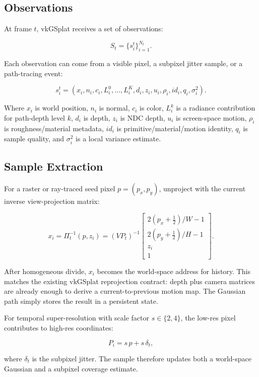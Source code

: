 \documentclass[11pt]{article}
\begin{document}
\subsection{Observations}

At frame $t$, vkGSplat receives a set of observations:

\[
  S_t = \{s_i^t\}_{i=1}^{N_t}.
\]

Each observation can come from a visible pixel, a subpixel jitter sample, or a
path-tracing event:

\[
  s_i^t =
  (x_i, n_i, c_i, L_i^0,\ldots,L_i^K, d_i, z_i, u_i,
   \rho_i, id_i, q_i, \sigma_i^2).
\]

Where $x_i$ is world position, $n_i$ is normal, $c_i$ is color, $L_i^k$ is a
radiance contribution for path-depth level $k$, $d_i$ is depth, $z_i$ is NDC
depth, $u_i$ is screen-space motion, $\rho_i$ is roughness/material metadata,
$id_i$ is primitive/material/motion identity, $q_i$ is sample quality, and
$\sigma_i^2$ is a local variance estimate.

\subsection{Sample Extraction}

For a raster or ray-traced seed pixel $p=(p_x,p_y)$, unproject with the current
inverse view-projection matrix:

\[
  x_i =
  \Pi_t^{-1}(p,z_i)
  =
  \left(VP_t\right)^{-1}
  \begin{bmatrix}
    2(p_x+\frac{1}{2})/W - 1\\
    2(p_y+\frac{1}{2})/H - 1\\
    z_i\\
    1
  \end{bmatrix}.
\]

After homogeneous divide, $x_i$ becomes the world-space address for history.
This matches the existing vkGSplat reprojection contract: depth plus camera
matrices are already enough to derive a current-to-previous motion map. The
Gaussian path simply stores the result in a persistent state.

For temporal super-resolution with scale factor $s\in\{2,4\}$, the low-res
pixel contributes to high-res coordinates:

\[
  P_i = s\,p + s\,\delta_t,
\]

where $\delta_t$ is the subpixel jitter. The sample therefore updates both a
world-space Gaussian and a subpixel coverage estimate.
\end{document}
